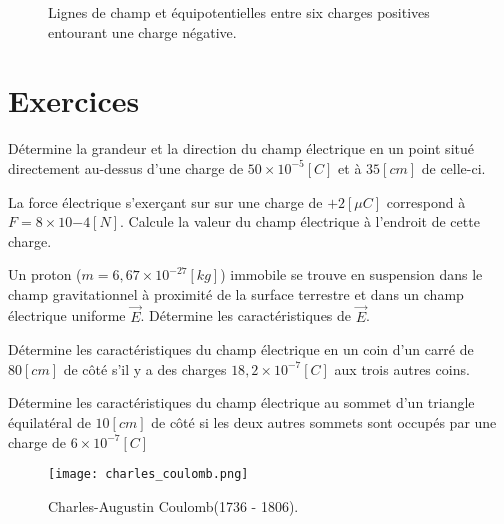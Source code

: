 \begin{figure}[!ht]
    \centering
    \resizebox{.7\linewidth}{!}{}
    \caption{Lignes de champ et équipotentielles entre six charges positives entourant une charge négative.}
    \label{six_charges}
\end{figure}


\newpage

\section{Exercices}
\begin{exercise}
    Détermine la grandeur et la direction du champ électrique en un point situé directement au-dessus d'une charge de \(50 \times 10^{-5}[C]\) et à \(35[cm]\) de celle-ci.
\end{exercise}

\begin{exercise}
    La force électrique s'exerçant sur sur une charge de \(+2 [\mu C]\) correspond à \(F=8 \times 10{-4}[N]\). Calcule la valeur du champ électrique à l'endroit de cette charge.
\end{exercise}

\begin{exercise}
    Un proton (\(m=6,67 \times 10^{-27}[kg]\)) immobile se trouve en suspension dans le champ gravitationnel à proximité de la surface terrestre et dans un champ électrique uniforme \(\vec{E}\). Détermine les caractéristiques de \(\vec{E}\).
\end{exercise}

\begin{exercise}
    Détermine les caractéristiques du champ électrique en un coin d'un carré de \(80[cm]\) de côté s'il y a des charges \(18,2 \times 10^{-7}[C]\) aux trois autres coins.
\end{exercise}

\begin{exercise}
    Détermine les caractéristiques du champ électrique au sommet d'un triangle équilatéral de \(10[cm]\) de côté si les deux autres sommets sont occupés par une charge de \(6 \times 10^{-7}[C]\)
\end{exercise}

\begin{figure}[h!]
    \centering
    \texttt{[image: charles\_coulomb.png]}
    \caption{Charles-Augustin Coulomb(1736 - 1806).}
    \label{charles_coulomb}
\end{figure}
